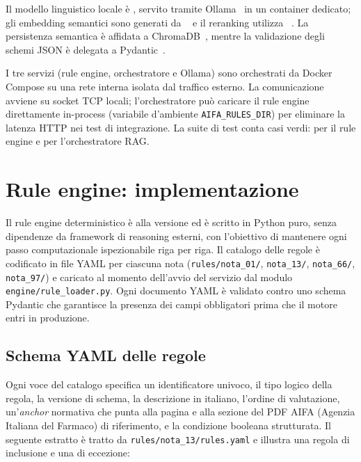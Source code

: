 Il modello linguistico locale è \llmmodel, servito tramite Ollama~\cite{ollama2024}
in un container dedicato; gli embedding semantici sono generati da
\embedmodel~\cite{reimers2019sbert} e il reranking utilizza
\reranker~\cite{nickprock2023}. La persistenza semantica è affidata a
ChromaDB~\cite{chromadb}, mentre la validazione degli schemi JSON è delegata
a Pydantic~\cite{pydantic}.

I tre servizi (rule engine, orchestratore e Ollama) sono orchestrati da
Docker Compose su una rete interna isolata dal traffico esterno. La
comunicazione avviene su socket TCP locali; l'orchestratore può caricare il
rule engine direttamente in-process (variabile d'ambiente
\texttt{AIFA\_RULES\_DIR}) per eliminare la latenza HTTP nei test di
integrazione. La suite di test conta \testcountall{} casi verdi: \testcountengine{}
per il rule engine e \testcountorch{} per l'orchestratore RAG.

\section{Rule engine: implementazione}
\label{sec:rule-engine-impl}

Il rule engine deterministico è alla versione \engineversion{} ed è scritto
in Python puro, senza dipendenze da framework di reasoning esterni, con
l'obiettivo di mantenere ogni passo computazionale ispezionabile riga per
riga. Il catalogo delle regole è codificato in file YAML per ciascuna nota
(\texttt{rules/nota\_01/}, \texttt{nota\_13/}, \texttt{nota\_66/},
\texttt{nota\_97/}) e caricato al momento dell'avvio del servizio dal
modulo \texttt{engine/rule\_loader.py}. Ogni documento YAML è validato contro
uno schema Pydantic che garantisce la presenza dei campi obbligatori prima
che il motore entri in produzione.

\subsection{Schema YAML delle regole}

Ogni voce del catalogo specifica un identificatore univoco, il tipo logico
della regola, la versione di schema, la descrizione in italiano, l'ordine di
valutazione, un'\emph{anchor} normativa che punta alla pagina e alla sezione
del PDF AIFA (Agenzia Italiana del Farmaco) di riferimento, e la condizione booleana strutturata. Il seguente
estratto è tratto da \texttt{rules/nota\_13/rules.yaml} e illustra una regola
di inclusione e una di eccezione:

